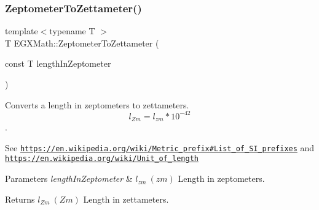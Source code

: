\subsubsection{\texorpdfstring{Zeptometer\+To\+Zettameter()}{ZeptometerToZettameter()}}
{\footnotesize\ttfamily template$<$typename T $>$ \\
T E\+G\+X\+Math\+::\+Zeptometer\+To\+Zettameter (\begin{DoxyParamCaption}\item[{const T}]{length\+In\+Zeptometer }\end{DoxyParamCaption})}



Converts a length in zeptometers to zettameters. \[ l_{Zm}=l_{zm} * 10^{-42} \]. 

See \href{https://en.wikipedia.org/wiki/Metric_prefix#List_of_SI_prefixes}{\tt https\+://en.\+wikipedia.\+org/wiki/\+Metric\+\_\+prefix\#\+List\+\_\+of\+\_\+\+S\+I\+\_\+prefixes} and \href{https://en.wikipedia.org/wiki/Unit_of_length}{\tt https\+://en.\+wikipedia.\+org/wiki/\+Unit\+\_\+of\+\_\+length} 
\begin{DoxyParams}{Parameters}
{\em length\+In\+Zeptometer} & $ l_{zm}\ (zm)$ Length in zeptometers. \\
\hline
\end{DoxyParams}
\begin{DoxyReturn}{Returns}
$ l_{Zm}\ (Zm)$ Length in zettameters. 
\end{DoxyReturn}
